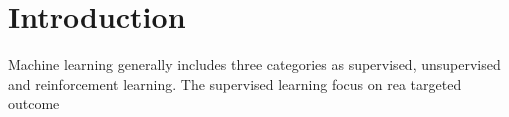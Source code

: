 \section{Introduction}

Machine learning generally includes three categories as supervised, unsupervised and reinforcement learning. The supervised learning focus on rea targeted outcome
